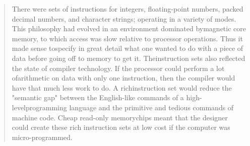 \begin{quotation}
	There were sets of instructions for integers, floating-point numbers, packed
	decimal numbers, and character strings; operating in a variety of modes. This
	philosophy had evolved in an environment dominated bymagnetic core memory, to
	which access was slow relative to processor operations. Thus it made sense
	tospecify in great detail what one wanted to do with a piece of data before
	going off to memory to get it. Theinstruction sets also reflected the state of
	compiler technology. If the processor could perform a lot ofarithmetic on data
	with only one instruction, then the compiler would have that much less work to
	do. A richinstruction set would reduce the "semantic gap" between the
	English-like commands of a high-levelprogramming language and the primitive and
	tedious commands of machine code. Cheap read-only memorychips meant that the
	designer could create these rich instruction sets at low cost if the computer
	was micro-programmed.
\end{quotation}

